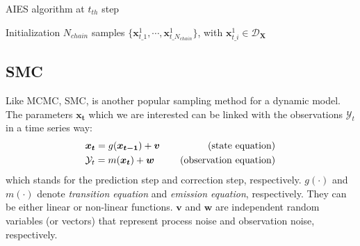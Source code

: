 \begin{algorithm}    
    \caption{\acrlong{AIES} algorithm at $t_{th}$ step}
    \label{Algorithm:AIES}
    Initialization $N_{chain}$ samples $\{  \boldsymbol{x}_{t\_1}^{1},\cdots,\boldsymbol{x}_{t\_{N_{chain}}}^{1}\}$, with $\boldsymbol{x}_{t\_i}^{1} \in \mathcal{D}_{\boldsymbol{X}}$\
    
\end{algorithm}



\subsection{\acrlong{SMC}}

Like \acrshort{MCMC}, \acrfull{SMC}, is another popular sampling method for a dynamic model. The parameters $\boldsymbol{{x}_{t}}$ which we are interested can be linked with the observations $\mathcal{Y}_{t}$ in a time series way:
\begin{equation}
\label{eq: Bayesian filtering}
\begin{aligned}
   & \boldsymbol{{x}_{t}}  =g(\boldsymbol{{x}_{t-1}}) + \boldsymbol{v} \ \   \ &\rm{(state  \ equation)}\\    
     &\mathcal{Y}_{t}=m(\boldsymbol{{x}_{t}}) + \boldsymbol{w} \ \ \ \ \ &\rm{(observation \  equation)}
\end{aligned}
\end{equation}
which stands for the prediction step and correction step, respectively.
$g(\cdot)$ and $m(\cdot)$ denote \textit{transition equation} and \textit{emission equation}, respectively. They can be either linear or non-linear functions. $\boldsymbol{v}$ and $\boldsymbol{w}$ are independent random variables (or vectors) that represent process noise and observation noise, respectively.


